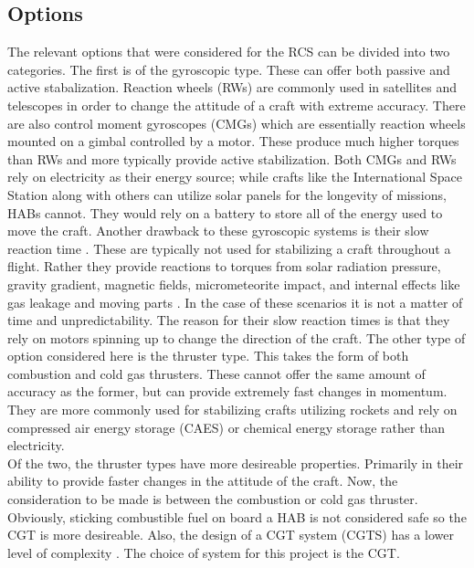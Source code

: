 \subsection{Options}
The relevant options that were considered for the RCS can be divided into two categories. The first is of the gyroscopic type. These can offer both passive and active stabalization. Reaction wheels (RWs) are commonly used in satellites and telescopes in order to change the attitude of a craft with extreme accuracy. There are also control moment gyroscopes (CMGs) which are essentially reaction wheels mounted on a gimbal controlled by a motor. These produce much higher torques than RWs and more typically provide active stabilization. Both CMGs and RWs rely on electricity as their energy source; while crafts like the International Space Station along with others can utilize solar panels \cite{satellitebattery}\cite{satellitebattery2} for the longevity of missions, HABs cannot. They would rely on a battery to store all of the energy used to move the craft. Another drawback to these gyroscopic systems is their slow reaction time \cite{satellitecontrol}. These are typically not used for stabilizing a craft throughout a flight. Rather they provide reactions to torques from solar radiation pressure, gravity gradient, magnetic fields, micrometeorite impact, and internal effects like gas leakage and moving parts \cite{electricvthruster}. In the case of these scenarios it is not a matter of time and unpredictability. The reason for their slow reaction times is that they rely on motors spinning up to change the direction of the craft. The other type of option considered here is the thruster type. This takes the form of both combustion and cold gas thrusters. These cannot offer the same amount of accuracy as the former, but can provide extremely fast changes in momentum. They are more commonly used for stabilizing crafts utilizing rockets and rely on compressed air energy storage (CAES) or chemical energy storage rather than electricity.\\
Of the two, the thruster types have more desireable properties. Primarily in their ability to provide faster changes in the attitude of the craft. Now, the consideration to be made is between the combustion or cold gas thruster. Obviously, sticking combustible fuel on board a HAB is not considered safe so the CGT is more desireable. Also, the design of a CGT system (CGTS) has a lower level of complexity \cite{thrusteroptions}. The choice of system for this project is the CGT.
